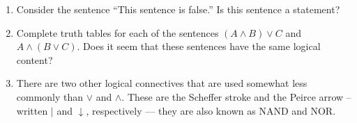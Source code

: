 \begin{enumerate}
\item Consider the sentence ``This sentence is false.''  Is this 
sentence a statement?


\hintspagebreak

\vfill

\workbookpagebreak

\item Complete truth tables for each of the sentences 
$(A \land B) \lor C$ and
$A \land (B \lor C)$.  Does it seem that these sentences have
the same logical content?

\vfill

\hintspagebreak
\workbookpagebreak

\item \label{ex:nand_nor} There are two other logical connectives that are
used somewhat less commonly than $\lor$ and $\land$.
These are the  Scheffer stroke and the 
Peirce arrow
-- written $\vert$ and $\downarrow$, respectively ---  they are 
also known as  NAND and  NOR.


\end{enumerate}
